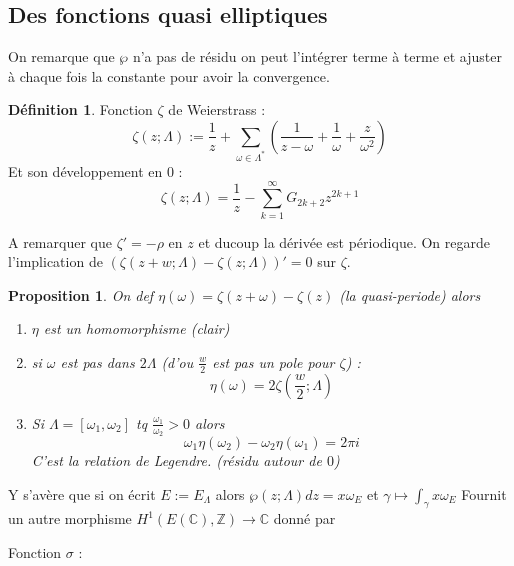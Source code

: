 \documentclass[12pt]{article}
\theoremstyle{plain}
\newtheorem{prop}[subsubsection]{Proposition}
\theoremstyle{definition}
\newtheorem{defn}[subsubsection]{D\'efinition}
\theoremstyle{remark}
\newcommand{\Z}{\mathbb{Z}}
\newcommand{\C}{\mathbb{C}}
\newcommand{\w}{\omega}
\begin{document}
\subsection{Des fonctions quasi elliptiques}
On remarque que $\wp$ n'a pas de résidu on peut l'intégrer terme à terme et ajuster à chaque fois la constante
pour avoir la convergence.
\begin{defn}
    Fonction $\zeta$ de Weierstrass : $$\zeta(z;\Lambda):=\frac{1}{z}+\sum_{\w\in\Lambda^*}\left(\frac{1}{z-\w}
    +\frac{1}{\w}+\frac{z}{\w^2}\right)$$
    Et son développement en $0$ :$$\zeta(z;\Lambda)=\frac{1}{z}-\sum_{k=1}^{\infty}G_{2k+2}z^{2k+1}$$
\end{defn}

A remarquer que $\zeta'=-\rho$ en $z$ et ducoup la dérivée est périodique. On regarde l'implication
de $(\zeta(z+w; \Lambda)-\zeta(z;\Lambda))'=0$ sur $\zeta$.

\begin{prop}
    On def $\eta(\w)=\zeta(z+\w)-\zeta(z)$ (la quasi-periode) alors \begin{enumerate}
        \item $\eta$ est un homomorphisme (clair)
        \item si $\w$ est pas dans $2\Lambda$ (d'ou $\frac{w}{2}$ est pas un pole pour $\zeta$) :$$\eta(\w)=2\zeta(\frac{w}{2};\Lambda)$$
        \item Si $\Lambda=[\w_1,\w_2]$ tq $\frac{\w_1}{\w_2}>0$ alors $$\w_1\eta(\w_2)-\w_2\eta(\w_1)=2\pi i$$C'est la relation de Legendre. (résidu autour de $0$)
    \end{enumerate}
\end{prop}
Y s'avère que si on écrit $E:=E_{\Lambda}$ alors $\wp(z;\Lambda)dz=x\w_E$ et $\gamma\mapsto\int_{\gamma}x\w_E$
Fournit un autre morphisme $H^1(E(\C),\Z)\rightarrow \C$ donné par 

Fonction $\sigma$ :
\end{document}
